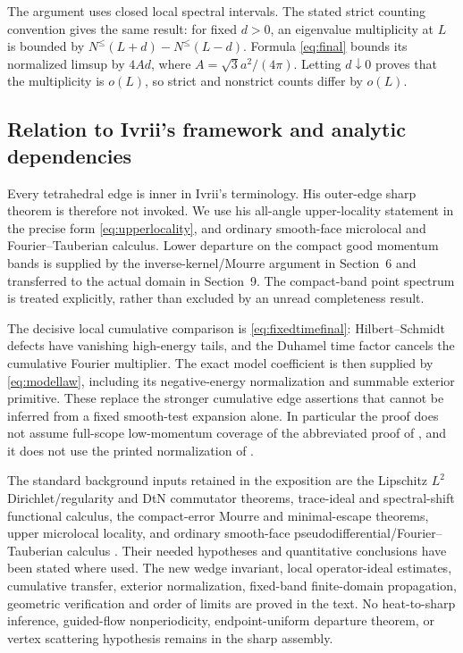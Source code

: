 \documentclass[11pt]{amsart}
\numberwithin{equation}{section}
\theoremstyle{remark}
\begin{document}
The argument uses closed local spectral intervals. The stated strict counting convention gives the same result: for fixed $d>0$, an eigenvalue multiplicity at $L$ is bounded by $N^{\le}(L+d)-N^{\le}(L-d)$. Formula \eqref{eq:final} bounds its normalized limsup by $4Ad$, where $A=\sqrt3a^2/(4\pi)$. Letting $d\downarrow0$ proves that the multiplicity is $o(L)$, so strict and nonstrict counts differ by $o(L)$.

\subsection{Relation to Ivrii's framework and analytic dependencies}
Every tetrahedral edge is inner in Ivrii's terminology. His outer-edge sharp theorem is therefore not invoked. We use his all-angle upper-locality statement in the precise form \eqref{eq:upperlocality}, and ordinary smooth-face microlocal and Fourier--Tauberian calculus. Lower departure on the compact good momentum bands is supplied by the inverse-kernel/Mourre argument in Section~6 and transferred to the actual domain in Section~9. The compact-band point spectrum is treated explicitly, rather than excluded by an unread completeness result.

The decisive local cumulative comparison is \eqref{eq:fixedtimefinal}: Hilbert--Schmidt defects have vanishing high-energy tails, and the Duhamel time factor cancels the cumulative Fourier multiplier. The exact model coefficient is then supplied by \eqref{eq:modellaw}, including its negative-energy normalization and summable exterior primitive. These replace the stronger cumulative edge assertions that cannot be inferred from a fixed smooth-test expansion alone. In particular the proof does not assume full-scope low-momentum coverage of the abbreviated proof of \cite[Corollary~3.8]{I}, and it does not use the printed normalization of \cite[equation~(4.3)]{I}.

The standard background inputs retained in the exposition are the Lipschitz $L^2$ Dirichlet/regularity and DtN commutator theorems, trace-ideal and spectral-shift functional calculus, the compact-error Mourre and minimal-escape theorems, upper microlocal locality, and ordinary smooth-face pseudodifferential/Fourier--Tauberian calculus \cite{M,SI,BO}. Their needed hypotheses and quantitative conclusions have been stated where used. The new wedge invariant, local operator-ideal estimates, cumulative transfer, exterior normalization, fixed-band finite-domain propagation, geometric verification and order of limits are proved in the text. No heat-to-sharp inference, guided-flow nonperiodicity, endpoint-uniform departure theorem, or vertex scattering hypothesis remains in the sharp assembly.
\end{document}

